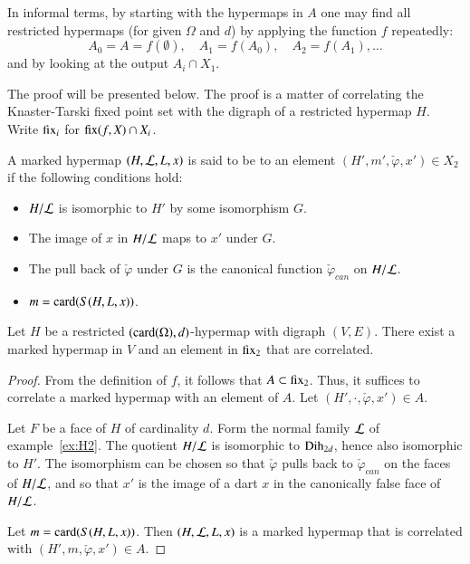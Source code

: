 In informal terms, by starting with the  hypermaps in $A$
one may find all restricted hypermaps (for given $\Omega$ and $d$) by
applying the function $f$ repeatedly:
\begin{displaymath}
A_0 = A = f(\emptyset),\quad A_1 = f(A_0),\quad A_2 = f(A_1),\ldots
\end{displaymath}
and by looking at the output $A_i \cap X_1$.
%

The proof will be presented below.  The proof is a matter of correlating the Knaster-Tarski fixed point set with the digraph of a restricted hypermap $H$.
Write ${\operatorname{fix}}_i$ for ${\operatorname{fix}}(f,X)\cap X_i$.


\begin{definition}[correlation]
  A marked hypermap $(H,{\cal L},L,x)$ is said to be
   to an element $(H',m',\check\varphi,x')\in X_2$ if
  the following conditions hold:
\begin{itemize}
\item $H/{\cal L}$ is isomorphic to $H'$ by some isomorphism $G$.
\item The image of $x$ in $H/{\cal L}$ maps to $x'$ under $G$.
\item The pull back of $\check\varphi$ under $G$ is the canonical function
$\check\varphi_{can}$ on $H/{\cal L}$.
\item $m = {\operatorname{card}}(S(H,L,x))$.
\end{itemize}
\end{definition}

\begin{lemma}\label{lemma:correlated-seed}
  Let $H$ be a restricted $({\operatorname{card}}(\Omega),d)$-hypermap with digraph
  $(V,E)$.  There exist a marked hypermap in
  $V$ and an element in ${\operatorname{fix}}_2$ that are
  correlated.
\end{lemma}

\begin{proof}  From the definition of $f$, it follows
that $A\subset {\operatorname{fix}}_2$.  Thus, it suffices to correlate a marked
hypermap with an element of $A$.  Let $(H',\cdot,\check\varphi,x')\in A$.

Let $F$ be a face of $H$ of cardinality $d$.  Form the normal family ${\cal L}$ of example~\ref{ex:H2}.  The quotient $H/{\cal L}$ is isomorphic to ${\operatorname{Dih}}_{2d}$, hence also isomorphic to $H'$.  The isomorphism can be chosen so that
$\check\varphi$ pulls back to $\check\varphi_{can}$ on the faces of $H/{\cal L}$, and so that $x'$ is the image of a dart $x$ in the canonically false 
face of $H/{\cal L}$.  

Let $m = {\operatorname{card}}(S(H,L,x))$.  Then $(H,{\cal L},L,x)$ is a marked hypermap that
is correlated with $(H',m,\check\varphi,x')\in A$.
\end{proof}

